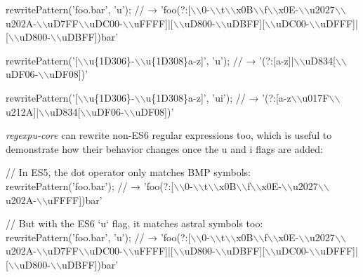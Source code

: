 \begin{DoxyCode}
rewritePattern('foo.bar', 'u');
// →
       'foo(?:[\(\backslash\)\(\backslash\)0-\(\backslash\)\(\backslash\)t\(\backslash\)\(\backslash\)x0B\(\backslash\)\(\backslash\)f\(\backslash\)\(\backslash\)x0E-\(\backslash\)\(\backslash\)u2027\(\backslash\)\(\backslash\)u202A-\(\backslash\)\(\backslash\)uD7FF\(\backslash\)\(\backslash\)uDC00-\(\backslash\)\(\backslash\)uFFFF]|[\(\backslash\)\(\backslash\)uD800-\(\backslash\)\(\backslash\)uDBFF][\(\backslash\)\(\backslash\)uDC00-\(\backslash\)\(\backslash\)uDFFF]|[\(\backslash\)\(\backslash\)uD800-\(\backslash\)\(\backslash\)uDBFF])bar'

rewritePattern('[\(\backslash\)\(\backslash\)u\{1D306\}-\(\backslash\)\(\backslash\)u\{1D308\}a-z]', 'u');
// → '(?:[a-z]|\(\backslash\)\(\backslash\)uD834[\(\backslash\)\(\backslash\)uDF06-\(\backslash\)\(\backslash\)uDF08])'

rewritePattern('[\(\backslash\)\(\backslash\)u\{1D306\}-\(\backslash\)\(\backslash\)u\{1D308\}a-z]', 'ui');
// → '(?:[a-z\(\backslash\)\(\backslash\)u017F\(\backslash\)\(\backslash\)u212A]|\(\backslash\)\(\backslash\)uD834[\(\backslash\)\(\backslash\)uDF06-\(\backslash\)\(\backslash\)uDF08])'
\end{DoxyCode}


{\itshape regexpu-\/core} can rewrite non-\/\+E\+S6 regular expressions too, which is useful to demonstrate how their behavior changes once the {\ttfamily u} and {\ttfamily i} flags are added\+:


\begin{DoxyCode}
// In ES5, the dot operator only matches BMP symbols:
rewritePattern('foo.bar');
// → 'foo(?:[\(\backslash\)\(\backslash\)0-\(\backslash\)\(\backslash\)t\(\backslash\)\(\backslash\)x0B\(\backslash\)\(\backslash\)f\(\backslash\)\(\backslash\)x0E-\(\backslash\)\(\backslash\)u2027\(\backslash\)\(\backslash\)u202A-\(\backslash\)\(\backslash\)uFFFF])bar'

// But with the ES6 `u` flag, it matches astral symbols too:
rewritePattern('foo.bar', 'u');
// →
       'foo(?:[\(\backslash\)\(\backslash\)0-\(\backslash\)\(\backslash\)t\(\backslash\)\(\backslash\)x0B\(\backslash\)\(\backslash\)f\(\backslash\)\(\backslash\)x0E-\(\backslash\)\(\backslash\)u2027\(\backslash\)\(\backslash\)u202A-\(\backslash\)\(\backslash\)uD7FF\(\backslash\)\(\backslash\)uDC00-\(\backslash\)\(\backslash\)uFFFF]|[\(\backslash\)\(\backslash\)uD800-\(\backslash\)\(\backslash\)uDBFF][\(\backslash\)\(\backslash\)uDC00-\(\backslash\)\(\backslash\)uDFFF]|[\(\backslash\)\(\backslash\)uD800-\(\backslash\)\(\backslash\)uDBFF])bar'
\end{DoxyCode}


